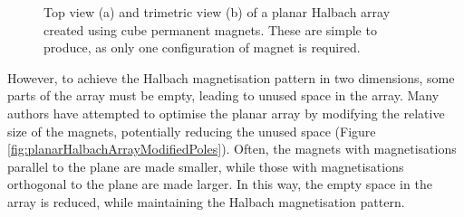 \begin{figure}
\begin{subfigure}{\linewidth}
        \vspace{-10mm}\subcaption{}
    \end{subfigure}
    \caption{Top view (a) and trimetric view (b) of a planar Halbach array created using cube permanent magnets. These are simple to produce, as only one configuration of magnet is required.}
    \label{fig:planarHalbachArray}
\end{figure}
However, to achieve the Halbach magnetisation pattern in two dimensions, some parts of the array must be empty, leading to unused space in the array. Many authors have attempted to optimise the planar array by modifying the relative size of the magnets, potentially reducing the unused space (Figure \ref{fig:planarHalbachArrayModifiedPoles}). Often, the magnets with magnetisations parallel to the plane are made smaller, while those with magnetisations orthogonal to the plane are made larger. In this way, the empty space in the array is reduced, while maintaining the Halbach magnetisation pattern.
